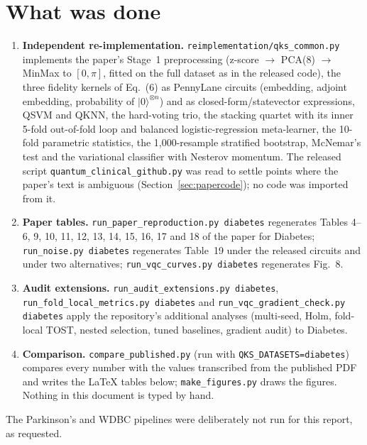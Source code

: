 \documentclass[11pt,a4paper]{article}
\newcommand{\code}[1]{\texttt{\small #1}}
\begin{document}
\tableofcontents

\section{What was done}
\begin{enumerate}[nosep]
  \item \textbf{Independent re-implementation.} \code{reimplementation/qks\_common.py} implements the paper's Stage~1 preprocessing (z-score $\to$ PCA(8) $\to$ MinMax to $[0,\pi]$, fitted on the full dataset as in the released code), the three fidelity kernels of Eq.~(6) as PennyLane circuits (embedding, adjoint embedding, probability of $|0\rangle^{\otimes n}$) and as closed-form/statevector expressions, QSVM and QKNN, the hard-voting trio, the stacking quartet with its inner 5-fold out-of-fold loop and balanced logistic-regression meta-learner, the 10-fold parametric statistics, the 1,000-resample stratified bootstrap, McNemar's test and the variational classifier with Nesterov momentum. The released script \code{quantum\_clinical\_github.py} was read to settle points where the paper's text is ambiguous (Section~\ref{sec:papercode}); no code was imported from it.
  \item \textbf{Paper tables.} \code{run\_paper\_reproduction.py diabetes} regenerates Tables 4--6, 9, 10, 11, 12, 13, 14, 15, 16, 17 and 18 of the paper for Diabetes; \code{run\_noise.py diabetes} regenerates Table~19 under the released circuits and under two alternatives; \code{run\_vqc\_curves.py diabetes} regenerates Fig.~8.
  \item \textbf{Audit extensions.} \code{run\_audit\_extensions.py diabetes}, \code{run\_fold\_local\_metrics.py diabetes} and \code{run\_vqc\_gradient\_check.py diabetes} apply the repository's additional analyses (multi-seed, Holm, fold-local TOST, nested selection, tuned baselines, gradient audit) to Diabetes.
  \item \textbf{Comparison.} \code{compare\_published.py} (run with \code{QKS\_DATASETS=diabetes}) compares every number with the values transcribed from the published PDF and writes the LaTeX tables below; \code{make\_figures.py} draws the figures. Nothing in this document is typed by hand.
\end{enumerate}
The Parkinson's and WDBC pipelines were deliberately not run for this report, as requested.
\end{document}
